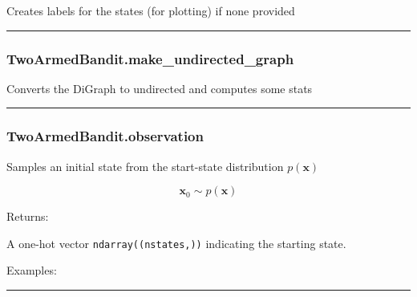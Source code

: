 Creates labels for the states (for plotting) if none provided

\begin{center}\rule{0.5\linewidth}{\linethickness}\end{center}

\subsubsection{TwoArmedBandit.make\_undirected\_graph}\label{twoarmedbandit.make_undirected_graph}

\begin{Shaded}
\begin{Highlighting}[]
\NormalTok{)}
\end{Highlighting}
\end{Shaded}

Converts the DiGraph to undirected and computes some stats

\begin{center}\rule{0.5\linewidth}{\linethickness}\end{center}

\subsubsection{TwoArmedBandit.observation}\label{twoarmedbandit.observation}

\begin{Shaded}
\begin{Highlighting}[]
\NormalTok{)}
\end{Highlighting}
\end{Shaded}

Samples an initial state from the start-state distribution
\(p(\mathbf x)\)

\[
\mathbf x_0 \sim p(\mathbf x)
\]

Returns:

A one-hot vector \texttt{ndarray((nstates,))} indicating the starting
state.

Examples:

\begin{Shaded}
\begin{Highlighting}[]
\OperatorTok{=}
\end{Highlighting}
\end{Shaded}

\begin{center}\rule{0.5\linewidth}{\linethickness}\end{center}

